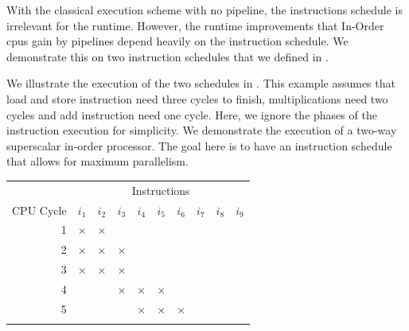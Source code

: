 With the classical execution scheme with no pipeline, the instructions schedule is irrelevant for the runtime.
However, the runtime improvements that In-Order \acp{cpu} gain by pipelines depend heavily on the instruction schedule.
We demonstrate this on two instruction schedules that we defined in .

We illustrate the execution of the two schedules in .
This example assumes that load and store instruction need three cycles to finish, multiplications need two cycles and add instruction need one cycle.
Here, we ignore the phases of the instruction execution for simplicity.
We demonstrate the execution of a two-way superscalar in-order processor.
The goal here is to have an instruction schedule that allows for maximum parallelism.
\begin{table}
    \scriptsize
    \begin{subtable}{0.48\textwidth}
        \begin{tabular}{rccccccccc} \toprule
            & \multicolumn{9}{c}{\fontsize{11pt}{9pt}\selectfont Instructions} \\
            \cmidrule{2-10}
            {\fontsize{11pt}{9pt}\selectfont CPU Cycle} & 
            {\fontsize{11pt}{9pt}\selectfont $i_1$} & 
            {\fontsize{11pt}{9pt}\selectfont $i_2$} & 
            {\fontsize{11pt}{9pt}\selectfont $i_3$} & 
            {\fontsize{11pt}{9pt}\selectfont $i_4$} & 
            {\fontsize{11pt}{9pt}\selectfont $i_5$} & 
            {\fontsize{11pt}{9pt}\selectfont $i_6$} & 
            {\fontsize{11pt}{9pt}\selectfont $i_7$} & 
            {\fontsize{11pt}{9pt}\selectfont $i_8$} & 
            {\fontsize{11pt}{9pt}\selectfont $i_9$} \\
            \midrule
             1 &$\boldsymbol{\times}$&$\boldsymbol{\times}$&   &   &   &   &   &   &   \\ \rowcolor[gray]{.975}
             2 &$\boldsymbol{\times}$&$\boldsymbol{\times}$&$\boldsymbol{\times}$&   &   &   &   &   &   \\
             3 &$\boldsymbol{\times}$&$\boldsymbol{\times}$&$\boldsymbol{\times}$&   &   &   &   &   &   \\ \rowcolor[gray]{.975}
             4 &   &   &$\boldsymbol{\times}$&$\boldsymbol{\times}$&$\boldsymbol{\times}$&   &   &   &   \\
             5 &   &   &   &$\boldsymbol{\times}$&$\boldsymbol{\times}$&$\boldsymbol{\times}$&   &   &   \\ \rowcolor[gray]{.975}

\end{tabular}
\end{subtable}
\end{table}
